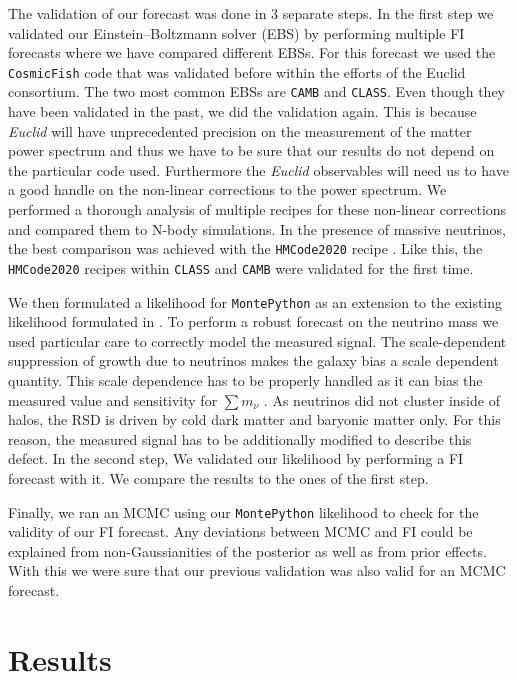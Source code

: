 \documentclass[a4paper,11pt]{article}
\newcommand{\euclid}{\textit{Euclid}\xspace}
\newcommand{\summnu}{\sum m_\nu}
\newcommand{\camb}{\texttt{CAMB}\xspace}
\newcommand{\class}{\texttt{CLASS}\xspace}
\newcommand{\montepython}{\texttt{MontePython}\xspace}
\newcommand{\cosmicfish}{\texttt{CosmicFish}\xspace}
\begin{document}
The validation of our forecast was done in 3 separate steps. In the first step we validated our Einstein--Boltzmann solver (EBS) by performing multiple FI forecasts where we have compared different EBSs. For this forecast we used the \cosmicfish code that was validated before within the efforts of the Euclid consortium\cite{ISTF2020}. The two most common EBSs are \camb\cite{2011ascl.soft02026L} and \class\cite{Diego_Blas_2011}. Even though they have been validated in the past, we did the validation again. This is because \euclid will have unprecedented precision on the measurement of the matter power spectrum and thus we have to be sure that our results do not depend on the particular code used. Furthermore the \euclid observables will need us to have a good handle on the non-linear corrections to the power spectrum. We performed a thorough analysis of multiple recipes for these non-linear corrections and compared them to N-body simulations. In the presence of massive neutrinos, the best comparison was achieved with the \texttt{HMCode2020} recipe \cite{Mead_2021}. Like this, the \texttt{HMCode2020} recipes within \class and \camb were validated for the first time.

We then formulated a likelihood for \montepython\cite{Audren:2012wb} as an extension to the existing likelihood formulated in \cite{casas2023euclidvalidationmontepythonforecasting}. To perform a robust forecast on the neutrino mass we used particular care to correctly model the measured signal. The scale-dependent suppression of growth due to neutrinos makes the galaxy bias a scale dependent quantity. This scale dependence has to be properly handled as it can bias the measured value and sensitivity for $\summnu$ \cite{Vagnozzi_2018}. As neutrinos did not cluster inside of halos, the RSD is driven by cold dark matter and baryonic matter only\cite{Villaescusa_Navarro_2018}. For this reason, the measured signal has to be additionally modified to describe this defect. In the second step, We validated our likelihood by performing a FI forecast with it. We compare the results to the ones of the first step.

Finally, we ran an MCMC using our \montepython likelihood to check for the validity of our FI forecast. Any deviations between MCMC and FI could be explained from non-Gaussianities of the posterior as well as from prior effects. With this we were sure that our previous validation was also valid for an MCMC forecast.

\section{Results}
\end{document}
